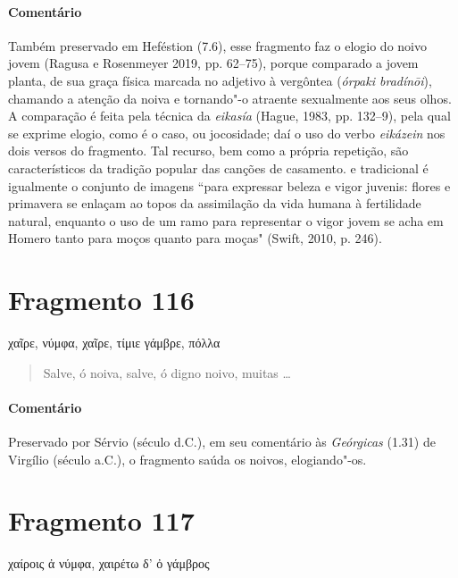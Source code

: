 {\paragraph{Comentário} Também preservado em Heféstion (7.6), esse fragmento faz o elogio do noivo jovem (Ragusa e Rosenmeyer 2019, pp. 62--75), porque comparado a jovem planta, de sua
graça física marcada no adjetivo à vergôntea (\textit{órpaki bradínōi}), chamando a atenção da noiva e tornando"-o atraente sexualmente aos seus olhos.
A comparação é feita pela técnica da \textit{eikasía} (Hague, 1983, pp. 132--9), pela qual se exprime elogio, como é o caso, ou jocosidade; daí o uso do verbo \textit{eikázein} nos dois versos do fragmento. Tal recurso, bem como a própria repetição, são característicos da tradição popular das canções de casamento. e tradicional é igualmente o conjunto de imagens “para expressar beleza e vigor juvenis: flores e primavera se enlaçam ao topos da assimilação da vida humana à fertilidade natural, enquanto o uso de um ramo para representar o vigor jovem se acha em Homero tanto para moços quanto para moças" (Swift, 2010, p. 246). }

\pagebreak
\section{Fragmento 116}

\begin{gkverse}
χαῖρε, νύμφα, χαῖρε, τίμιε γάμβρε, πόλλα
\end{gkverse}

\begin{verse}
Salve, ó noiva, salve, ó digno noivo, muitas \ldots{}
\end{verse}

{\paragraph{Comentário} Preservado por Sérvio (século  d.C.), em seu comentário às \textit{Geórgicas} (1.31) de Virgílio (século  a.C.), o fragmento saúda os noivos, elogiando"-os.}


\section{Fragmento 117}

\begin{gkverse}
\dagger{}χαίροις ἀ νύμφα\dagger{}, χαιρέτω δ’ ὀ γάμβρος
\end{gkverse}

